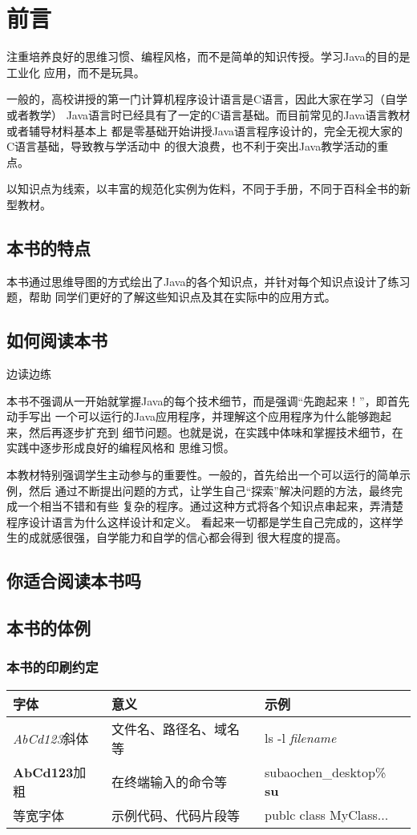 \frontmatter
\chapter{前言}
注重培养良好的思维习惯、编程风格，而不是简单的知识传授。学习Java的目的是工业化
应用，而不是玩具。

一般的，高校讲授的第一门计算机程序设计语言是C语言，因此大家在学习（自学或者教学）
Java语言时已经具有了一定的C语言基础。而目前常见的Java语言教材或者辅导材料基本上
都是零基础开始讲授Java语言程序设计的，完全无视大家的C语言基础，导致教与学活动中
的很大浪费，也不利于突出Java教学活动的重点。

以知识点为线索，以丰富的规范化实例为佐料，不同于手册，不同于百科全书的新型教材。

\section*{本书的特点}
本书通过思维导图的方式绘出了Java的各个知识点，并针对每个知识点设计了练习题，帮助
同学们更好的了解这些知识点及其在实际中的应用方式。
\section*{如何阅读本书}
边读边练

本书不强调从一开始就掌握Java的每个技术细节，而是强调“先跑起来！”，即首先动手写出
一个可以运行的Java应用程序，并理解这个应用程序为什么能够跑起来，然后再逐步扩充到
细节问题。也就是说，在实践中体味和掌握技术细节，在实践中逐步形成良好的编程风格和
思维习惯。

本教材特别强调学生主动参与的重要性。一般的，首先给出一个可以运行的简单示例，然后
通过不断提出问题的方式，让学生自己“探索”解决问题的方法，最终完成一个相当不错和有些
复杂的程序。通过这种方式将各个知识点串起来，弄清楚程序设计语言为什么这样设计和定义。
看起来一切都是学生自己完成的，这样学生的成就感很强，自学能力和自学的信心都会得到
很大程度的提高。

\section*{你适合阅读本书吗}
\section*{本书的体例}
\subsection*{本书的印刷约定}
\begin{tabular}{|l|l|l|}
    \hline
    字体 & 意义 & 示例 \\
    \hline
    \textsl{AbCd123}斜体 & 文件名、路径名、域名等 & ls -l \textsl{filename}\\
    \hline
    \textbf{AbCd123}加粗 & 在终端输入的命令等 & subaochen\_desktop\% \textbf{su} \\
    \hline
    等宽字体 & 示例代码、代码片段等 & publc class MyClass... \\
    \hline

\end{tabular}

